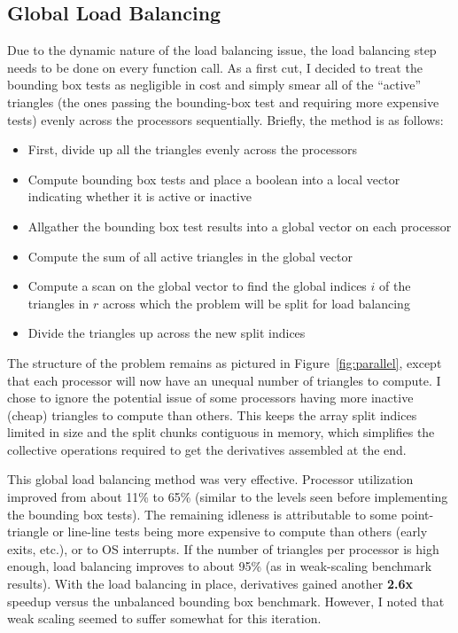 \documentclass[11pt,letterpaper]{article}
\begin{document}
\subsection{Global Load Balancing}
\qquad Due to the dynamic nature of the load balancing issue, the load balancing step needs to be done on every function call.
As a first cut, I decided to treat the bounding box tests as negligible in cost and simply smear all of the ``active'' triangles (the ones passing the bounding-box test and requiring more expensive tests) evenly across the processors sequentially.
Briefly, the method is as follows:
\begin{itemize}
\item First, divide up all the triangles evenly across the processors
\item Compute bounding box tests and place a boolean into a local vector indicating whether it is active or inactive
\item Allgather the bounding box test results into a global vector on each processor
\item Compute the sum of all active triangles in the global vector
\item Compute a scan on the global vector to find the global indices $i$ of the triangles in $r$ across which the problem will be split for load balancing
\item Divide the triangles up across the new split indices
\end{itemize}
The structure of the problem remains as pictured in Figure~\ref{fig:parallel}, except that each processor will now have an unequal number of triangles to compute.
I chose to ignore the potential issue of some processors having more inactive (cheap) triangles to compute than others.
This keeps the array split indices limited in size and the split chunks contiguous in memory, which simplifies the collective operations required to get the derivatives assembled at the end.

\qquad This global load balancing method was very effective.
Processor utilization improved from about 11\% to 65\% (similar to the levels seen before implementing the bounding box tests).
The remaining idleness is attributable to some point-triangle or line-line tests being more expensive to compute than others (early exits, etc.), or to OS interrupts.
If the number of triangles per processor is high enough, load balancing improves to about 95\% (as in weak-scaling benchmark results).
With the load balancing in place, derivatives gained another \textbf{2.6x} speedup versus the unbalanced bounding box benchmark.
However, I noted that weak scaling seemed to suffer somewhat for this iteration.
\end{document}
